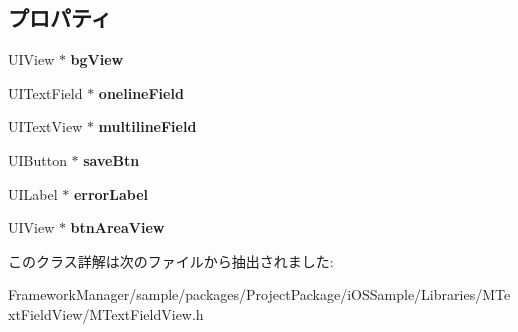\subsection*{プロパティ}
\begin{DoxyCompactItemize}
\item 
\hypertarget{interface_m_text_field_view_a5cf6dc4111f320d7979756bd2b428792}{}U\+I\+View $\ast$ {\bfseries bg\+View}\label{interface_m_text_field_view_a5cf6dc4111f320d7979756bd2b428792}

\item 
\hypertarget{interface_m_text_field_view_ad4757b42d8263e91841cb6505f13258c}{}U\+I\+Text\+Field $\ast$ {\bfseries oneline\+Field}\label{interface_m_text_field_view_ad4757b42d8263e91841cb6505f13258c}

\item 
\hypertarget{interface_m_text_field_view_a635aa690feb36fe2f7fdf5c4fbca2919}{}U\+I\+Text\+View $\ast$ {\bfseries multiline\+Field}\label{interface_m_text_field_view_a635aa690feb36fe2f7fdf5c4fbca2919}

\item 
\hypertarget{interface_m_text_field_view_ad68d6e574b2c98af84fa4ac04abd188e}{}U\+I\+Button $\ast$ {\bfseries save\+Btn}\label{interface_m_text_field_view_ad68d6e574b2c98af84fa4ac04abd188e}

\item 
\hypertarget{interface_m_text_field_view_a7e0a399590f6cd1d055be1a8647e69b7}{}U\+I\+Label $\ast$ {\bfseries error\+Label}\label{interface_m_text_field_view_a7e0a399590f6cd1d055be1a8647e69b7}

\item 
\hypertarget{interface_m_text_field_view_a0aded0a5871c2a9d6ee1d85f30ec418b}{}U\+I\+View $\ast$ {\bfseries btn\+Area\+View}\label{interface_m_text_field_view_a0aded0a5871c2a9d6ee1d85f30ec418b}

\end{DoxyCompactItemize}


このクラス詳解は次のファイルから抽出されました\+:\begin{DoxyCompactItemize}
\item 
Framework\+Manager/sample/packages/\+Project\+Package/i\+O\+S\+Sample/\+Libraries/\+M\+Text\+Field\+View/M\+Text\+Field\+View.\+h\end{DoxyCompactItemize}
